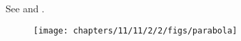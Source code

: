 See 
and
.
\begin{figure}[H]
	\begin{center} 
	    \texttt{[image: chapters/11/11/2/2/figs/parabola]}
	\end{center}
\caption{}
\label{fig:chapters/11/11/2/2/Fig1}
\end{figure}




